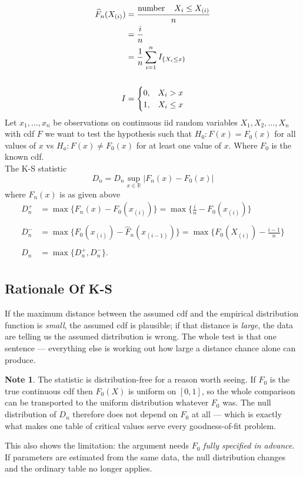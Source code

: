 \documentclass[11pt,a4paper]{article}
\theoremstyle{definition}
\newtheorem{note}[thm]{Note}
\begin{document}
\begin{align*}
\widehat{F}_n(X_{(i)}) &=\frac{\text{number}\hspace{0.4cm}X_i\leq X_{(i)}}{n}\\
                 &=\frac{i}{n}\\
                 &=\frac{1}{n}\sum^n_{i=1}I_{\{X_i\leq x\}}\\\\
      I &=
\begin{cases}
0, & X_i>x\\
1, &X_i\leq x
\end{cases}
\end{align*}
Let $x_1,\dots,x_n$ be observations on continuous iid random variables $X_1,X_2,\dots,X_n$ with cdf $F$ we want to test the hypothesis such that $H_0:F(x)=F_0(x)$ for all values of $x$ vs $H_a:F(x)\neq F_0(x)$ for at least one value of $x$. Where $F_0$ is the known cdf.\\ The K-S statistic $$D_n=D_n\sup_{x\in \mathbb{R}}|F_n(x)-F_0(x)|$$ where $F_n(x)$ is as given above
\begin{align*}
 D^+_n &=\max\{F_n(x)-F_0(x_{(i)})\}=\max \Big\{\frac{i}{n}-F_0(x_{(i)})\Big\}\\\\
 D^-_n &=\max\{F_0(x_{(i)})-\widehat{F}_n(x_{(i-1)})\}=\max \Big\{F_0(X_{(i)})-\frac{i-1}{n}\Big\}\\\\
 D_n &=\max \{D_n^+,D_n^-\}.\\
\end{align*}









\subsection{Rationale Of K-S}
If the maximum distance between the assumed cdf and the empirical distribution
function is \emph{small}, the assumed cdf is plausible; if that distance is
\emph{large}, the data are telling us the assumed distribution is wrong. The whole
test is that one sentence --- everything else is working out how large a distance
chance alone can produce.

\begin{note}
The statistic is distribution-free for a reason worth seeing. If $F_0$ is the true
continuous cdf then $F_0(X)$ is uniform on $[0,1]$, so the whole comparison can be
transported to the uniform distribution whatever $F_0$ was. The null distribution
of $D_n$ therefore does not depend on $F_0$ at all --- which is exactly what makes
one table of critical values serve every goodness-of-fit problem.

This also shows the limitation: the argument needs $F_0$ \emph{fully specified in
advance}. If parameters are estimated from the same data, the null distribution
changes and the ordinary table no longer applies.
\end{note}
\end{document}
